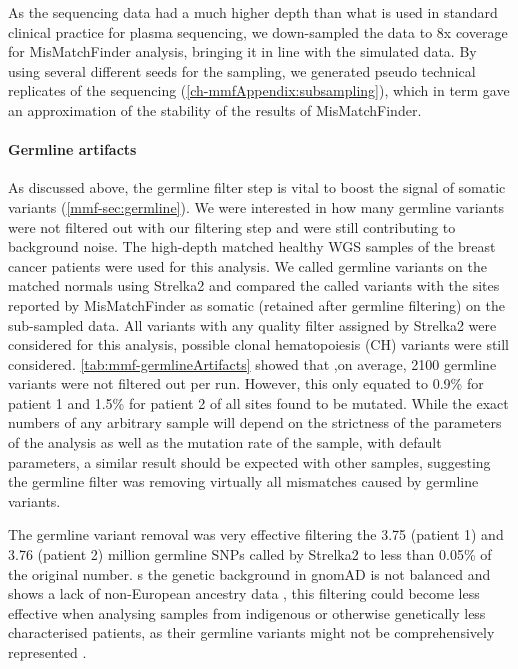 As the sequencing data had a much higher depth than what is used in standard clinical practice for plasma sequencing, we down-sampled the data to 8x coverage for MisMatchFinder analysis, bringing it in line with the simulated data. By using several different seeds for the sampling, we generated pseudo technical replicates of the sequencing (\autoref{ch-mmfAppendix:subsampling}), which in term gave an approximation of the stability of the results of MisMatchFinder.


\paragraph{Germline artifacts}
\label{mmf-sec:germlineArtifacts}
As discussed above, the germline filter step is vital to boost the signal of somatic variants (\autoref{mmf-sec:germline}). We were interested in how many germline variants were not filtered out with our filtering step and were still contributing to background noise. The high-depth matched healthy WGS samples of the breast cancer patients were used for this analysis. We called germline variants on the matched normals using Strelka2 and compared the called variants with the sites reported by MisMatchFinder as somatic (retained after germline filtering) on the sub-sampled data. All variants with any quality filter assigned by Strelka2 were considered for this analysis,  possible clonal hematopoiesis (CH) variants were still considered. \autoref{tab:mmf-germlineArtifacts} showed that ,on average, 2100 germline variants were not filtered out per run. However, this only equated to 0.9\% for patient 1 and 1.5\% for patient 2 of all sites found to be mutated. While the exact numbers of any arbitrary sample will depend on the strictness of the parameters of the analysis as well as the mutation rate of the sample, with default parameters, a similar result should be expected with other samples, suggesting the germline filter was removing virtually all mismatches caused by germline variants.

The germline variant removal was very effective filtering the 3.75 (patient 1) and 3.76 (patient 2) million germline SNPs called by Strelka2 to less than 0.05\% of the original number. s the genetic background in gnomAD is not balanced and shows a lack of non-European ancestry data \cite{Tiao2020}, this filtering could become less effective when analysing samples from indigenous or otherwise genetically less characterised patients, as their germline variants might not be comprehensively represented \cite{Nassar2022}.

